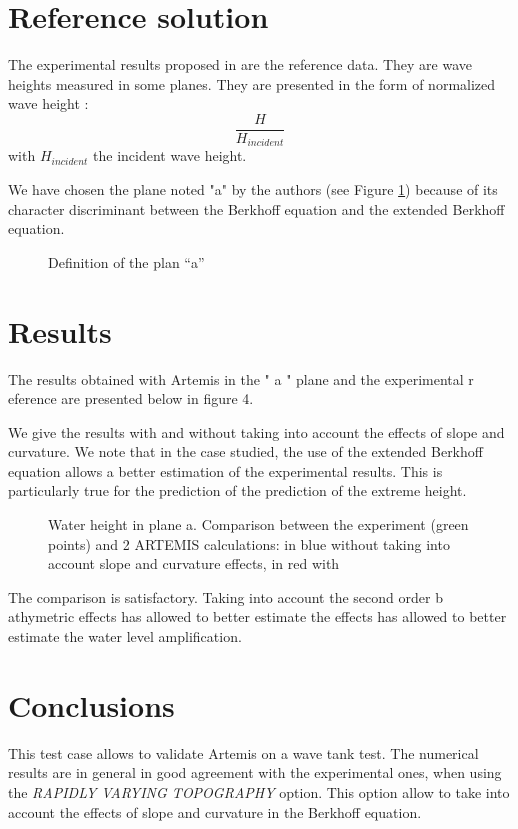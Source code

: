 \section{Reference solution}
The experimental results proposed in \cite{Chandrasekera1997} are the
reference data. They are wave heights measured in some planes. They are
presented in the form of normalized wave height :
$$
\frac{H}{H_{incident}}
$$
with $H_{incident}$ the incident wave height.

We have chosen the plane noted "a" by the authors (see Figure
\ref{fig:plan_bosse}) because of
its character discriminant between the Berkhoff equation and the extended
Berkhoff equation.

\begin{figure}[h]
\begin{center}
\end{center}
\caption{Definition of the plan ``a''}
\label{fig:plan_bosse}
\end{figure}


\section{Results}

The results obtained with Artemis in the " a " plane and the experimental r
eference are presented below in figure 4.



We give the results with and without taking into account the effects of slope
and curvature. We note that in the case studied, the use of the extended
Berkhoff equation allows a better estimation of the experimental results.
This is particularly true for the prediction of the
prediction of the extreme height.

\begin{figure}[h]
\begin{center}
\end{center}
\caption{ Water height in plane a. Comparison between the experiment (green
  points) and 2 ARTEMIS calculations: in blue without taking into account
  slope and curvature effects, in red with}
\label{fig:resu_bosse}
\end{figure}

The comparison is satisfactory. Taking into account the second order b
athymetric effects has allowed to better estimate the
effects has allowed to better estimate the water level amplification.

\section{Conclusions}

This test case allows to validate Artemis on a wave tank test. The numerical
results are in  general in good agreement with the experimental ones,
when using the {\it RAPIDLY VARYING TOPOGRAPHY} option.
This  option allow to take into account the effects of slope and curvature in
the Berkhoff equation.



